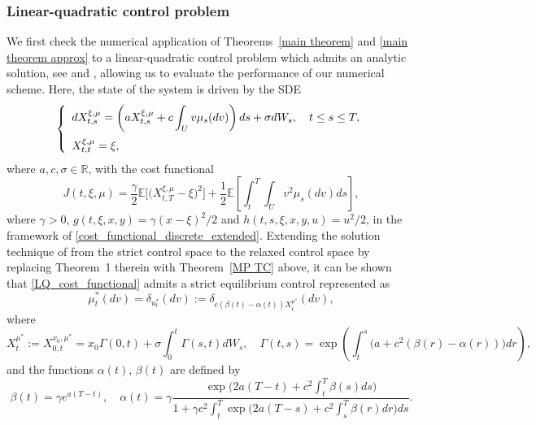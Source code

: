 \documentclass[12pt]{article}
\theoremstyle{named}
\numberwithin{equation}{section}
\let\oldcitet=\citet
\renewcommand{\cite}[1]{\textcolor[rgb]{0,0,1}{\oldcitet{#1}}}
\renewcommand{\citet}[1]{\textcolor[rgb]{0,0,1}{\oldcitet{#1}}}
\begin{document}
\subsubsection{Linear-quadratic control problem}
We first check the numerical application of
Theorems~\ref{main theorem} and \ref{main theorem approx}
to a linear-quadratic control problem which admits an analytic solution,
 see \cite{bjork2010general} and \cite{djehiche2016characterization},
 allowing us to evaluate the performance of our numerical scheme.
Here, the state of the system is driven by the SDE
\begin{equation}
  \label{LQ_SDE}
  \left\{
  \begin{array}{l}
    \displaystyle dX^{\xi,\mu}_{t,s} = \left(
    aX^{\xi,\mu}_{t,s} + c \int_U v \mu_s(dv)\right) ds + \sigma dW_s,
     \quad t \leq s \leq T,
\medskip
\\
X^{\xi,\mu}_{t,t} = \xi,
  \end{array}
  \right.
\end{equation}
where $a, c, \sigma \in \mathbb{R}$,
 with the cost functional
 \begin{equation}
   \label{LQ_cost_functional}
  J(t,\xi ,\mu) =
  \frac{\gamma}{2}
  \mathbb{E}\big[ \big(X^{\xi ,\mu}_{t,T} - \xi \big)^2 \big]
    + \frac{1}{2}\mathbb{E}\left[\int_t^T \int_U v^2 \mu_s(dv) ds\right],
\end{equation}
 where $\gamma > 0$,
 $g(t,\xi ,x,y) = \gamma (x-\xi)^2/2$
 and
 $h(t,s,\xi ,x,y,u) = u^2/2$,
 in the framework of \eqref{cost_functional_discrete_extended}.
Extending the solution technique of \cite{djehiche2016characterization}
from the strict control space to the relaxed control space
by replacing Theorem~1 therein with Theorem~\ref{MP TC} above,
it can be shown that \eqref{LQ_cost_functional} admits
 a strict equilibrium control represented as
\begin{equation}
  \label{mun1}
 \mu^*_t (dv) = \delta_{u^*_t}(dv)
  := \delta_{c(\beta (t)-\alpha (t)) X^{\mu^*}_t}(dv),
\end{equation}
 where
$$
 X^{\mu^*}_t :=
X^{x_0 , \mu^*}_{0,t}=
 x_0 \Gamma(0,t) + \sigma \int_0^t \Gamma(s, t) dW_s,
\quad
\Gamma(t, s) = \exp\left(\int_t^s \big(
a + c^2 (\beta (r) - \alpha (r) ) \big)
dr\right),
$$
 and the functions $\alpha (t)$, $\beta (t)$ are defined by
$$
\beta (t) =\gamma e^{a(T-t)}, \quad
\alpha (t) = \gamma \frac{
 \exp\big(2a(T-t) + c^2\int_t^T \beta (s) ds\big)}{ 1 + \gamma  c^2 \int_t^T \exp\big(
2a(T-s) + c^2 \int_s^T \beta (r) dr\big) ds}.
$$
\end{document}
